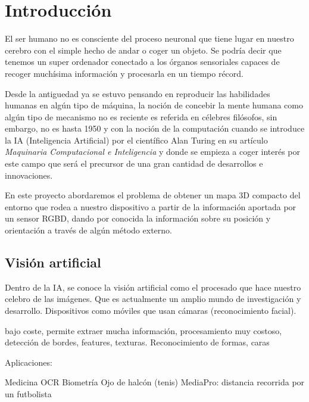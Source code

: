 
\chapter{Introducción} %

\label{Chapter1} %

El ser humano no es consciente del proceso neuronal que tiene lugar en nuestro cerebro con el simple hecho de andar o coger un objeto. Se podría decir que tenemos un super ordenador conectado a los órganos sensoriales capaces de recoger muchísima información y procesarla en un tiempo récord.

Desde la antiguedad ya se estuvo pensando en reproducir las habilidades humanas en algún tipo de máquina, la noción de concebir la mente humana como algún tipo de mecanismo no es reciente es referida en célebres filósofos, sin embargo, no es hasta 1950 y con la noción de la computación cuando se introduce la IA (Inteligencia Artificial) por el científico Alan Turing en su artículo \textit{Maquinaria Computacional e Inteligencia} y donde se empieza a coger interés por este campo que será el precursor de una gran cantidad de desarrollos e innovaciones.

En este proyecto abordaremos el problema de obtener un mapa 3D compacto del
entorno que rodea a nuestro dispositivo a partir de la información aportada por un
sensor RGBD, dando por conocida la información sobre su posición y orientación a
través de algún método externo.

\section{Visión artificial}

Dentro de la IA, se conoce la visión artificial como el procesado que hace nuestro celebro de las imágenes. Que es actualmente un amplio mundo de investigación y desarrollo. Dispositivos como móviles que usan cámaras (reconocimiento facial).

bajo coste, permite extraer mucha información, procesamiento muy costoso, detección de bordes, features, texturas. Reconocimiento de formas, caras

Aplicaciones:

Medicina
OCR
Biometría
Ojo de halcón (tenis)
MediaPro: distancia recorrida por un futbolista





